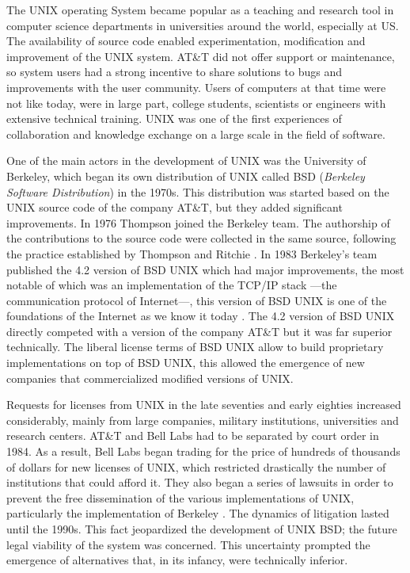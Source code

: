 The UNIX operating System became popular as a teaching and research tool in computer science departments in universities around the world, especially at US. The availability of source code enabled experimentation, modification and improvement of the UNIX system. AT\&T did not offer support or maintenance, so system users had a strong incentive to share solutions to bugs and improvements with the user community. Users of computers at that time were not like today, were in large part, college students, scientists or engineers with extensive technical training. UNIX was one of the first experiences of collaboration and knowledge exchange on a large scale in the field of software.

One of the main actors in the development of UNIX was the University of Berkeley, which began its own distribution of UNIX called BSD (\emph{Berkeley Software Distribution}) in the 1970s. This distribution was started based on the UNIX source code of the company AT\&T, but they added significant improvements. In 1976 Thompson joined the Berkeley team. The authorship of the contributions to the source code were collected in the same source, following the practice established by Thompson and Ritchie \citep[27]{weber:2004}. In 1983 Berkeley's team  published the 4.2 version of BSD UNIX which had major improvements, the most notable of which was an implementation of the TCP/IP stack ---the communication protocol of Internet---, this version of BSD UNIX is one of the foundations of the Internet as we know it today \citep[35]{weber:2004}. The 4.2 version of BSD UNIX directly competed with a version of the company AT\&T but it was far superior technically. The liberal license terms of BSD UNIX allow to build proprietary implementations on top of BSD UNIX, this allowed the emergence of new companies that commercialized modified versions of UNIX. 

Requests for licenses from UNIX in the late seventies and early eighties increased considerably, mainly from large companies, military institutions, universities and research centers. AT\&T and Bell Labs had to be separated by court order in 1984. As a result, Bell Labs began trading for the price of hundreds of thousands of dollars for new licenses of UNIX, which restricted drastically the number of institutions that could afford it. They also began a series of lawsuits in order to prevent the free dissemination of the various implementations of UNIX, particularly the implementation of Berkeley \cite[22]{roca:2007}. The dynamics of litigation lasted until the 1990s. This fact jeopardized the development of UNIX BSD; the future legal viability of the system was concerned. This uncertainty prompted the emergence of alternatives that, in its infancy, were technically inferior.

